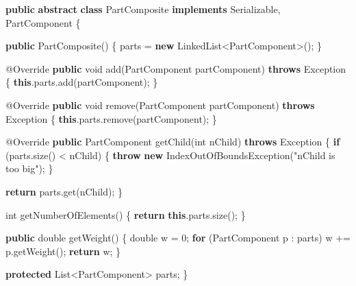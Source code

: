 \documentclass[french,]{article}
\newenvironment{Shaded}{}{}
\newcommand{\KeywordTok}[1]{\textcolor[rgb]{0.00,0.44,0.13}{\textbf{#1}}}
\newcommand{\DataTypeTok}[1]{\textcolor[rgb]{0.56,0.13,0.00}{#1}}
\newcommand{\DecValTok}[1]{\textcolor[rgb]{0.25,0.63,0.44}{#1}}
\newcommand{\StringTok}[1]{\textcolor[rgb]{0.25,0.44,0.63}{#1}}
\newcommand{\FunctionTok}[1]{\textcolor[rgb]{0.02,0.16,0.49}{#1}}
\newcommand{\BuiltInTok}[1]{#1}
\newcommand{\AttributeTok}[1]{\textcolor[rgb]{0.49,0.56,0.16}{#1}}
\newcommand{\NormalTok}[1]{#1}
\begin{document}
\begin{Shaded}
\begin{Highlighting}[]
\KeywordTok{public} \KeywordTok{abstract} \KeywordTok{class}\NormalTok{ PartComposite }\KeywordTok{implements} \BuiltInTok{Serializable}\NormalTok{, PartComponent \{}

 \KeywordTok{public} \FunctionTok{PartComposite}\NormalTok{() \{}
\NormalTok{  parts = }\KeywordTok{new} \BuiltInTok{LinkedList}\NormalTok{<PartComponent>();}
\NormalTok{ \}}

 \AttributeTok{@Override}
 \KeywordTok{public} \DataTypeTok{void} \FunctionTok{add}\NormalTok{(PartComponent partComponent) }\KeywordTok{throws} \BuiltInTok{Exception}\NormalTok{ \{}
  \KeywordTok{this}\NormalTok{.}\FunctionTok{parts}\NormalTok{.}\FunctionTok{add}\NormalTok{(partComponent);}
\NormalTok{ \}}

 \AttributeTok{@Override}
 \KeywordTok{public} \DataTypeTok{void} \FunctionTok{remove}\NormalTok{(PartComponent partComponent) }\KeywordTok{throws} \BuiltInTok{Exception}\NormalTok{ \{}
  \KeywordTok{this}\NormalTok{.}\FunctionTok{parts}\NormalTok{.}\FunctionTok{remove}\NormalTok{(partComponent);}
\NormalTok{ \}}

 \AttributeTok{@Override}
 \KeywordTok{public}\NormalTok{ PartComponent }\FunctionTok{getChild}\NormalTok{(}\DataTypeTok{int}\NormalTok{ nChild) }\KeywordTok{throws} \BuiltInTok{Exception}\NormalTok{ \{}
  \KeywordTok{if}\NormalTok{ (parts.}\FunctionTok{size}\NormalTok{() < nChild) \{}
   \KeywordTok{throw} \KeywordTok{new} \BuiltInTok{IndexOutOfBoundsException}\NormalTok{(}\StringTok{"nChild is too big"}\NormalTok{);}
\NormalTok{  \}}

  \KeywordTok{return}\NormalTok{ parts.}\FunctionTok{get}\NormalTok{(nChild);}
\NormalTok{ \}}

 \DataTypeTok{int} \FunctionTok{getNumberOfElements}\NormalTok{() \{}
  \KeywordTok{return} \KeywordTok{this}\NormalTok{.}\FunctionTok{parts}\NormalTok{.}\FunctionTok{size}\NormalTok{();}
\NormalTok{ \}}

 \KeywordTok{public} \DataTypeTok{double} \FunctionTok{getWeight}\NormalTok{() \{}
  \DataTypeTok{double}\NormalTok{ w = }\DecValTok{0}\NormalTok{;}
  \KeywordTok{for}\NormalTok{ (PartComponent p : parts)}
\NormalTok{   w += p.}\FunctionTok{getWeight}\NormalTok{();}
  \KeywordTok{return}\NormalTok{ w;}
\NormalTok{ \}}

 \KeywordTok{protected} \BuiltInTok{List}\NormalTok{<PartComponent> parts;}
\NormalTok{\}}
\end{Highlighting}
\end{Shaded}
\end{document}
